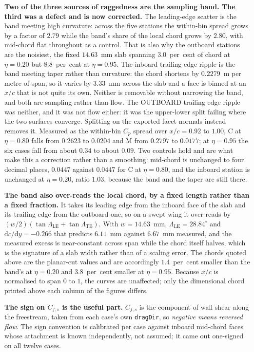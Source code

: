 \textbf{Two of the three sources of raggedness are the sampling band. The third was a defect and
is now corrected.} The leading-edge scatter is the band meeting high curvature: across the five
stations the within-bin spread grows by a factor of $2.79$ while the band's share of the local
chord grows by $2.80$, with mid-chord flat throughout as a control. That is also why the outboard
stations are the noisiest, the fixed $14.63$~mm slab spanning $3.0$~per~cent of chord at
$\eta = 0.20$ but $8.8$~per~cent at $\eta = 0.95$. The inboard trailing-edge ripple is the band
meeting taper rather than curvature: the chord shortens by $0.2279$~m per metre of span, so it
varies by $3.33$~mm across the slab and a face is binned at an $x/c$ that is not quite its own.
Neither is removable without narrowing the band, and both are sampling rather than flow. The
OUTBOARD trailing-edge ripple was neither, and it was not flow either: it was the upper-lower
split failing where the two surfaces converge. Splitting on the exported facet normals instead
removes it. Measured as the within-bin $C_p$ spread over $x/c = 0.92$ to $1.00$, C at
$\eta = 0.80$ falls from $0.2623$ to $0.0204$ and M from $0.2797$ to $0.0177$; at $\eta = 0.95$
the six cases fall from about $0.34$ to about $0.09$. Two controls hold and are what make this a
correction rather than a smoothing: mid-chord is unchanged to four decimal places, $0.0447$
against $0.0447$ for C at $\eta = 0.80$, and the inboard station is unchanged at $\eta = 0.20$,
ratio $1.03$, because the band and the taper are still there.

\textbf{The band also over-reads the local chord, by a fixed length rather than a fixed
fraction.} It takes its leading edge from the inboard face of the slab and its trailing edge from
the outboard one, so on a swept wing it over-reads by
$(w/2)(\tan\Lambda_{\mathrm{LE}} + \tan\Lambda_{\mathrm{TE}})$. With $w = 14.63$~mm,
$\Lambda_{\mathrm{LE}} = 28.84^\circ$ and $\mathrm{d}c/\mathrm{d}y = -0.266$ that predicts
$6.11$~mm against $6.67$~mm measured, and the measured excess is near-constant across span while
the chord itself halves, which is the signature of a slab width rather than of a scaling error.
The chords quoted above are the planar-cut values and are accordingly $1.4$~per~cent smaller than
the band's at $\eta = 0.20$ and $3.8$~per~cent smaller at $\eta = 0.95$. Because $x/c$ is
normalised to span $0$ to $1$, the curves are unaffected; only the dimensional chord printed
above each column of the figures differs.

\textbf{The sign on $C_{f,s}$ is the useful part.} $C_{f,s}$ is the component of wall shear
along the freestream, taken from each case's own \texttt{dragDir}, so \emph{negative means
reversed flow}. The sign convention is calibrated per case against inboard mid-chord faces whose
attachment is known independently, not assumed; it came out one-signed on all twelve cases.

